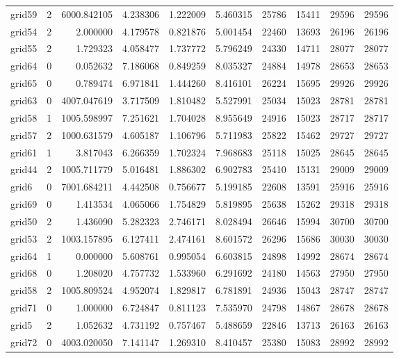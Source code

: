 \begin{longtable}{|l|r|r|r|r|r|r|r|r|r|}
grid59 & 2 & 6000.842105 & 4.238306 & 1.222009 & 5.460315 & 25786 & 15411 & 29596 & 29596 \\
grid54 & 2 & 2.000000 & 4.179578 & 0.821876 & 5.001454 & 22460 & 13693 & 26196 & 26196 \\
grid55 & 2 & 1.729323 & 4.058477 & 1.737772 & 5.796249 & 24330 & 14711 & 28077 & 28077 \\
grid64 & 0 & 0.052632 & 7.186068 & 0.849259 & 8.035327 & 24884 & 14978 & 28653 & 28653 \\
grid65 & 0 & 0.789474 & 6.971841 & 1.444260 & 8.416101 & 26224 & 15695 & 29926 & 29926 \\
grid63 & 0 & 4007.047619 & 3.717509 & 1.810482 & 5.527991 & 25034 & 15023 & 28781 & 28781 \\
grid58 & 1 & 1005.598997 & 7.251621 & 1.704028 & 8.955649 & 24916 & 15023 & 28717 & 28717 \\
grid57 & 2 & 1000.631579 & 4.605187 & 1.106796 & 5.711983 & 25822 & 15462 & 29727 & 29727 \\
grid61 & 1 & 3.817043 & 6.266359 & 1.702324 & 7.968683 & 25118 & 15025 & 28645 & 28645 \\
grid44 & 2 & 1005.711779 & 5.016481 & 1.886302 & 6.902783 & 25410 & 15131 & 29009 & 29009 \\
grid6 & 0 & 7001.684211 & 4.442508 & 0.756677 & 5.199185 & 22608 & 13591 & 25916 & 25916 \\
grid69 & 0 & 1.413534 & 4.065066 & 1.754829 & 5.819895 & 25638 & 15262 & 29318 & 29318 \\
grid50 & 2 & 1.436090 & 5.282323 & 2.746171 & 8.028494 & 26646 & 15994 & 30700 & 30700 \\
grid53 & 2 & 1003.157895 & 6.127411 & 2.474161 & 8.601572 & 26296 & 15686 & 30030 & 30030 \\
grid64 & 1 & 0.000000 & 5.608761 & 0.995054 & 6.603815 & 24898 & 14992 & 28674 & 28674 \\
grid68 & 0 & 1.208020 & 4.757732 & 1.533960 & 6.291692 & 24180 & 14563 & 27950 & 27950 \\
grid58 & 2 & 1005.809524 & 4.952074 & 1.829817 & 6.781891 & 24936 & 15043 & 28747 & 28747 \\
grid71 & 0 & 1.000000 & 6.724847 & 0.811123 & 7.535970 & 24798 & 14867 & 28678 & 28678 \\
grid5 & 2 & 1.052632 & 4.731192 & 0.757467 & 5.488659 & 22846 & 13713 & 26163 & 26163 \\
grid72 & 0 & 4003.020050 & 7.141147 & 1.269310 & 8.410457 & 25380 & 15083 & 28992 & 28992 \\

\end{longtable}
